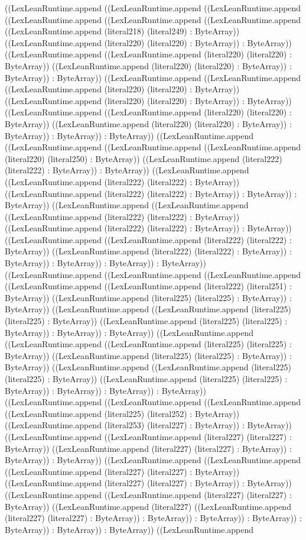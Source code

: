 \documentclass[11pt]{article}
\begin{document}
((LexLeanRuntime.append ((LexLeanRuntime.append ((LexLeanRuntime.append ((LexLeanRuntime.append ((LexLeanRuntime.append ((LexLeanRuntime.append ((LexLeanRuntime.append (literal218) (literal249) : ByteArray)) ((LexLeanRuntime.append (literal220) (literal220) : ByteArray)) : ByteArray)) ((LexLeanRuntime.append ((LexLeanRuntime.append (literal220) (literal220) : ByteArray)) ((LexLeanRuntime.append (literal220) (literal220) : ByteArray)) : ByteArray)) : ByteArray)) ((LexLeanRuntime.append ((LexLeanRuntime.append ((LexLeanRuntime.append (literal220) (literal220) : ByteArray)) ((LexLeanRuntime.append (literal220) (literal220) : ByteArray)) : ByteArray)) ((LexLeanRuntime.append ((LexLeanRuntime.append (literal220) (literal220) : ByteArray)) ((LexLeanRuntime.append (literal220) (literal220) : ByteArray)) : ByteArray)) : ByteArray)) : ByteArray)) ((LexLeanRuntime.append ((LexLeanRuntime.append ((LexLeanRuntime.append ((LexLeanRuntime.append (literal220) (literal250) : ByteArray)) ((LexLeanRuntime.append (literal222) (literal222) : ByteArray)) : ByteArray)) ((LexLeanRuntime.append ((LexLeanRuntime.append (literal222) (literal222) : ByteArray)) ((LexLeanRuntime.append (literal222) (literal222) : ByteArray)) : ByteArray)) : ByteArray)) ((LexLeanRuntime.append ((LexLeanRuntime.append ((LexLeanRuntime.append (literal222) (literal222) : ByteArray)) ((LexLeanRuntime.append (literal222) (literal222) : ByteArray)) : ByteArray)) ((LexLeanRuntime.append ((LexLeanRuntime.append (literal222) (literal222) : ByteArray)) ((LexLeanRuntime.append (literal222) (literal222) : ByteArray)) : ByteArray)) : ByteArray)) : ByteArray)) : ByteArray)) ((LexLeanRuntime.append ((LexLeanRuntime.append ((LexLeanRuntime.append ((LexLeanRuntime.append ((LexLeanRuntime.append (literal222) (literal251) : ByteArray)) ((LexLeanRuntime.append (literal225) (literal225) : ByteArray)) : ByteArray)) ((LexLeanRuntime.append ((LexLeanRuntime.append (literal225) (literal225) : ByteArray)) ((LexLeanRuntime.append (literal225) (literal225) : ByteArray)) : ByteArray)) : ByteArray)) ((LexLeanRuntime.append ((LexLeanRuntime.append ((LexLeanRuntime.append (literal225) (literal225) : ByteArray)) ((LexLeanRuntime.append (literal225) (literal225) : ByteArray)) : ByteArray)) ((LexLeanRuntime.append ((LexLeanRuntime.append (literal225) (literal225) : ByteArray)) ((LexLeanRuntime.append (literal225) (literal225) : ByteArray)) : ByteArray)) : ByteArray)) : ByteArray)) ((LexLeanRuntime.append ((LexLeanRuntime.append ((LexLeanRuntime.append ((LexLeanRuntime.append (literal225) (literal252) : ByteArray)) ((LexLeanRuntime.append (literal253) (literal227) : ByteArray)) : ByteArray)) ((LexLeanRuntime.append ((LexLeanRuntime.append (literal227) (literal227) : ByteArray)) ((LexLeanRuntime.append (literal227) (literal227) : ByteArray)) : ByteArray)) : ByteArray)) ((LexLeanRuntime.append ((LexLeanRuntime.append ((LexLeanRuntime.append (literal227) (literal227) : ByteArray)) ((LexLeanRuntime.append (literal227) (literal227) : ByteArray)) : ByteArray)) ((LexLeanRuntime.append ((LexLeanRuntime.append (literal227) (literal227) : ByteArray)) ((LexLeanRuntime.append (literal227) ((LexLeanRuntime.append (literal227) (literal227) : ByteArray)) : ByteArray)) : ByteArray)) : ByteArray)) : ByteArray)) : ByteArray)) : ByteArray)) ((LexLeanRuntime.append 
\end{document}
